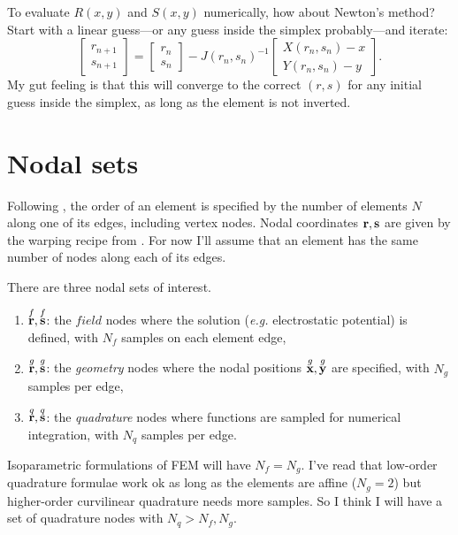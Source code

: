 To evaluate $R(x,y)$ and $S(x,y)$ numerically, how about Newton's method?  Start with a linear guess---or any guess inside the simplex probably---and iterate:
%
\begin{equation}
\boxed{
\begin{bmatrix} r_{n+1} \\ s_{n+1} \end{bmatrix}
=
\begin{bmatrix} r_n \\ s_n \end{bmatrix}
-
J(r_n, s_n)^{-1}
\begin{bmatrix}X(r_n, s_n) - x \\ Y(r_n, s_n) - y \end{bmatrix}.
}%
\end{equation}
%
My gut feeling is that this will converge to the correct $(r,s)$ for any initial guess inside the simplex, as long as the element is not inverted.

\section{Nodal sets}

Following \cite{hesthaven2007nodal}, the order of an element is specified by the number of elements $N$ along one of its edges, including vertex nodes.  Nodal coordinates $\textbf{r}, \textbf{s}$ are given by the warping recipe from \cite{hesthaven2007nodal}.  For now I'll assume that an element has the same number of nodes along each of its edges.

There are three nodal sets of interest.
%
\begin{enumerate}
  \item $\overset{f}{\textbf{r}}, \overset{f}{\textbf{s}}$: the $field$ nodes where the solution (\emph{e.g.} electrostatic potential) is defined, with $N_f$ samples on each element edge,
  \item $\overset{g}{\textbf{r}}, \overset{g}{\textbf{s}}$: the \emph{geometry} nodes where the nodal positions $\overset{g}{\textbf{x}}, \overset{g}{\textbf{y}}$ are specified, with $N_g$ samples per edge,
  \item $\overset{q}{\textbf{r}}, \overset{q}{\textbf{s}}$: the \emph{quadrature} nodes where functions are sampled for numerical integration, with $N_q$ samples per edge.
\end{enumerate}
%
Isoparametric formulations of FEM will have $N_f = N_g$.  I've read that low-order quadrature formulae work ok as long as the elements are affine ($N_g = 2$) but higher-order curvilinear quadrature needs more samples.  So I think I will have a set of quadrature nodes with $N_q > N_f, N_g$.

